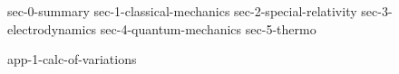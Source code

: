 \documentclass[11pt, letterpaper]{report}
\begin{document}
\begin{titlepage}
\maketitle
\tableofcontents
\end{titlepage}


{sec-0-summary}
{sec-1-classical-mechanics}
{sec-2-special-relativity}
{sec-3-electrodynamics}
{sec-4-quantum-mechanics}
{sec-5-thermo}


\begin{appendices}
{app-1-calc-of-variations}
\end{appendices}


\newpage




\end{document}
